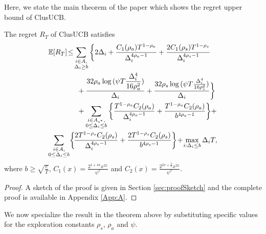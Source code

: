 	
	Here, we state the main theorem of the paper which shows the regret upper bound of ClusUCB.
	
\begin{theorem}
\label{Result:Theorem:1}
The regret $R_T$ of ClusUCB satisfies
\begin{align*}
&\mathbb{E} [R_{T}]\!\leq\! 
\sum\limits_{\substack{i\in A,\\\Delta_{i}\geq b}} \bigg\lbrace 2\Delta_{i}+
\frac{C_1(\rho_{a})T^{1-\rho_{a}}}{\Delta_{i}^{4\rho_{a}-1}} 
+ \frac{2C_1(\rho_{s})T^{1-\rho_{s}}}{\Delta_{i}^{4\rho_{s}-1}} \\
&\qquad\qquad+ \frac{32\rho_{a}\log{(\psi T\dfrac{\Delta_{i}^{4}}{16\rho_{a}^{2}})}}{\Delta_{i}}
+ \dfrac{32\rho_{s}\log{(\psi T\frac{\Delta_{i}^{4}}{16\rho_{s}^{2}})}}{\Delta_{i}}\bigg\rbrace  \\
&\qquad\qquad+
\sum\limits_{\substack{i\in A_{s^{*}},\\0\leq\Delta_{i}\leq b}}\bigg\lbrace \frac{T^{1-\rho_{a}}C_2(\rho_{a})}{\Delta_{i}^{4\rho_{a}-1}}+\frac{T^{1-\rho_{a}}C_2(\rho_a)}{b^{4\rho_{a} -1}} \bigg\rbrace + \\
&\!\sum\limits_{\substack{i\in A,\\0\leq\Delta_{i}\leq b}}\!\bigg\lbrace \! \frac{2T^{1-\rho_{s}}C_2(\rho_{s})}{\Delta_{i}^{4\rho_{s}-1}} +\frac{2T^{1-\rho_{s}}C_2(\rho_{s})}{b^{4\rho_{s} -1}} \bigg\rbrace 
\!+\! \max\limits_{i:\Delta_{i}\leq b}\Delta_{i}T, 
\end{align*}
where $b\geq \sqrt{\frac{e}{T}}$, $C_1(x) = \frac{2^{1+4x}x^{2x}}{\psi^{x}}$ and $C_2(x) = \frac{2^{2x+\frac{3}{2}}x^{2x}}{\psi^{x}}$. 
\end{theorem}
\begin{proof}
 A sketch of the proof is given in Section \ref{sec:proofSketch} and the complete proof is available in Appendix \ref{App:A}.
\end{proof}

	
	

We now specialize the result in the theorem above by substituting specific values for the exploration constants $\rho_{s}$, $\rho_{a}$ and $\psi$. 

